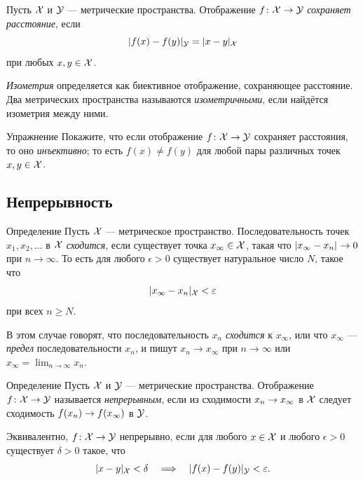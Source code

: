 {Пусть $\mathcal{X}$ и $\mathcal{Y}$ --- метрические пространства.
Отображение $f\:\spc{X} \z\to \spc{Y}$ \emph{сохраняет расстояние}, если 
$$\dist{f(x)}{f(y)}{\spc{Y}}
 = \dist{x}{y}{\spc{X}}$$
при любых $x,y\in {\mathcal{X}}$.

\emph{Изометрия} определяется как биективное отображение, сохраняющее расстояние.
Два метрических пространства называются \emph{изометричными}, если найдётся изометрия между ними.

\begin{thm}{Упражнение}\label{ex:dist-preserv=>injective}
Покажите, что если отображение $f\colon\mathcal{X}\to\mathcal{Y}$ сохраняет расстояния, то оно \emph{инъективно};
то есть $f(x)\ne f(y)$ для любой пары различных точек $x, y\in \mathcal{X}$.
\end{thm}


\subsection*{Непрерывность}

\begin{thm}{Определение}
Пусть ${\mathcal{X}}$ --- метрическое пространство.
Последовательность точек $x_1, x_2, \ldots$ в ${\mathcal{X}}$ \emph{сходится}, 
если существует точка $x_\infty\in {\mathcal{X}}$, такая что $\dist{x_\infty}{x_n}{}\to 0$ при $n\to\infty$.  
То есть для любого $\epsilon > 0$ существует натуральное число $N$, такое что 
\[
\dist{x_\infty}{x_n}{\spc{X}}
<
\epsilon
\]
при всех $n \ge N$.

В этом случае говорят, что последовательность $x_n$ \emph{сходится} к $x_\infty$, 
или что $x_\infty$ --- \emph{предел} последовательности $x_n$,
и пишут $x_n\to x_\infty$ при $n\to\infty$ или $x_\infty=\lim_{n\to\infty} x_n$.
\end{thm}

\begin{thm}{Определение}\label{def:continuous}
Пусть $\mathcal{X}$ и $\mathcal{Y}$ --- метрические пространства.
Отображение $f\colon\mathcal{X}\to \mathcal{Y}$ называется \emph{непрерывным}, если из сходимости $x_n\z\to x_\infty$ в ${\mathcal{X}}$
следует сходимость $f(x_n) \z\to f(x_\infty)$ в $\mathcal{Y}$.

Эквивалентно, $f\colon\mathcal{X}\to \mathcal{Y}$ непрерывно, если для любого $x\in {\mathcal{X}}$ и любого $\epsilon>0$
существует $\delta>0$ такое, что 
$$\dist{x}{y}{\spc{X}}<\delta\quad\Longrightarrow\quad \dist{f(x)}{f(y)}{\spc{Y}}<\epsilon.$$


\end{thm}}
